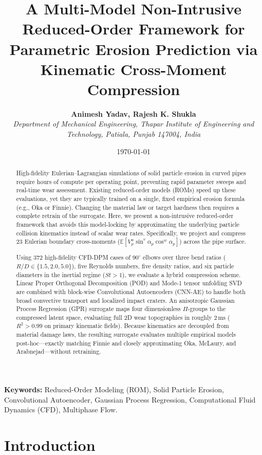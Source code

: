 \documentclass{article}
\title{\textbf{A Multi-Model Non-Intrusive Reduced-Order Framework for Parametric Erosion Prediction via Kinematic Cross-Moment Compression}}
\author{\textbf{Animesh Yadav, Rajesh K. Shukla}\\[0.5em]
\small{\textit{Department of Mechanical Engineering, Thapar Institute of Engineering and Technology, Patiala, Punjab 147004, India}}}
\date{\today}
\begin{document}
\maketitle

\begin{abstract}
High-fidelity Eulerian--Lagrangian simulations of solid particle erosion in curved pipes require hours of compute per operating point, preventing rapid parameter sweeps and real-time wear assessment. Existing reduced-order models (ROMs) speed up these evaluations, yet they are typically trained on a single, fixed empirical erosion formula (e.g., Oka or Finnie). Changing the material law or target hardness then requires a complete retrain of the surrogate. Here, we present a non-intrusive reduced-order framework that avoids this model-locking by approximating the underlying particle collision kinematics instead of scalar wear rates. Specifically, we project and compress 23 Eulerian boundary cross-moments ($\mathbb{E}[V_p^u \sin^v\alpha_p \cos^w\alpha_p]$) across the pipe surface.

Using 372 high-fidelity CFD-DPM cases of $90^\circ$ elbows over three bend ratios ($R/D \in \{1.5, 2.0, 5.0\}$), five Reynolds numbers, five density ratios, and six particle diameters in the inertial regime ($St > 1$), we evaluate a hybrid compression scheme. Linear Proper Orthogonal Decomposition (POD) and Mode-1 tensor unfolding SVD are combined with block-wise Convolutional Autoencoders (CNN-AE) to handle both broad convective transport and localized impact craters. An anisotropic Gaussian Process Regression (GPR) surrogate maps four dimensionless $\Pi$-groups to the compressed latent space, evaluating full 2D wear topographies in roughly $2\,\mathrm{ms}$ ($R^2 > 0.99$ on primary kinematic fields). Because kinematics are decoupled from material damage laws, the resulting surrogate evaluates multiple empirical models post-hoc---exactly matching Finnie and closely approximating Oka, McLaury, and Arabnejad---without retraining.
\end{abstract}

\textbf{Keywords:} Reduced-Order Modeling (ROM), Solid Particle Erosion, Convolutional Autoencoder, Gaussian Process Regression, Computational Fluid Dynamics (CFD), Multiphase Flow.

\section{Introduction}
\label{sec:introduction}
\end{document}
